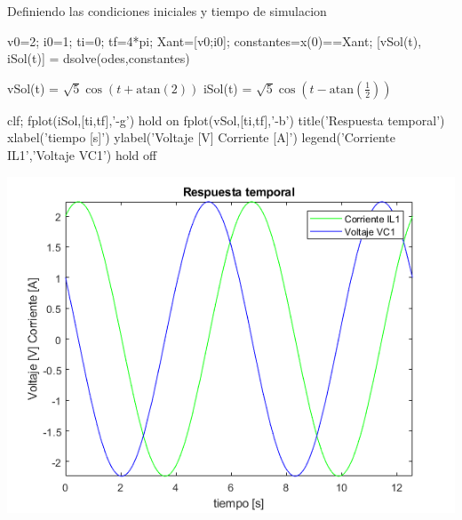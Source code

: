 \documentclass[10pt,a4paper]{article} %
\begin{document}
	\begin{par}
		\begin{flushleft}
			Definiendo las condiciones iniciales y tiempo de simulacion
		\end{flushleft}
	\end{par}
	
	\begin{matlabcode}
		v0=2;
		i0=1;
		ti=0;
		tf=4*pi;
		Xant=[v0;i0];
		constantes=x(0)==Xant;
		[vSol(t), iSol(t)] = dsolve(odes,constantes)
	\end{matlabcode}
	\begin{matlabsymbolicoutput}
		vSol(t) = 
		$\displaystyle \sqrt{5} \cos \left(t+\textrm{atan}\left(2\right)\right)$
		iSol(t) = 
		$\displaystyle \sqrt{5} \cos \left(t-\textrm{atan}\left(\frac{1}{2}\right)\right)$
	\end{matlabsymbolicoutput}
	
	
	\begin{matlabcode}
		clf;
		fplot(iSol,[ti,tf],'-g')
		hold on
		fplot(vSol,[ti,tf],'-b')
		title('Respuesta temporal')
		xlabel('tiempo [s]')
		ylabel('Voltaje [V] Corriente [A]')
		legend({'Corriente IL1','Voltaje VC1'})
		hold off
	\end{matlabcode}
	\begin{center}
		\includegraphics[width=\maxwidth{56.196688409433015em}]{figure_0_00}
	\end{center}
	
\end{document}
